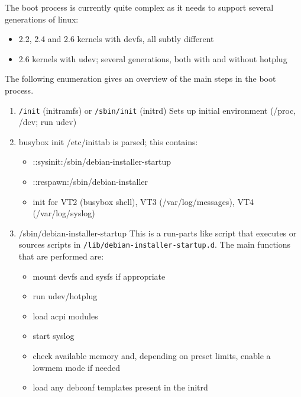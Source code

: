 \documentclass[a4paper,10pt]{article}
\begin{document}
The boot process is currently quite complex as it needs to support several generations of linux: 

\begin{itemize}
\item 2.2, 2.4 and 2.6 kernels with devfs, all subtly different
\item 2.6 kernels with udev; several generations, both with and without hotplug
\end{itemize}

The following enumeration gives an overview of the main steps in the boot process. 

\begin{enumerate}
\item
  \begin{flushleft}
\texttt{/init} (initramfs) or \texttt{/sbin/init} (initrd) \linebreak
Sets up initial environment (/proc, /dev; run udev)
  \end{flushleft}
\item
  \begin{flushleft}
busybox init \linebreak
/etc/inittab is parsed; this contains:
  \end{flushleft}
  \begin{itemize}
\item ::sysinit:/sbin/debian-installer-startup
\item ::respawn:/sbin/debian-installer
\item init for VT2 (busybox shell), VT3 (/var/log/messages), VT4 (/var/log/syslog)
  \end{itemize}
\item
  \begin{flushleft}
/sbin/debian-installer-startup \linebreak
This is a run-parts like script that executes or sources scripts in \texttt{/lib/debian-installer-startup.d}. The main functions that are performed are:
  \end{flushleft}
  \begin{itemize}
\item mount devfs and sysfs if appropriate
\item run udev/hotplug
\item load acpi modules 
\item start syslog 
\item check available memory and, depending on preset limits, enable a lowmem mode if needed 
\item load any debconf templates present in the initrd 

\end{itemize}
\end{enumerate}
\end{document}
